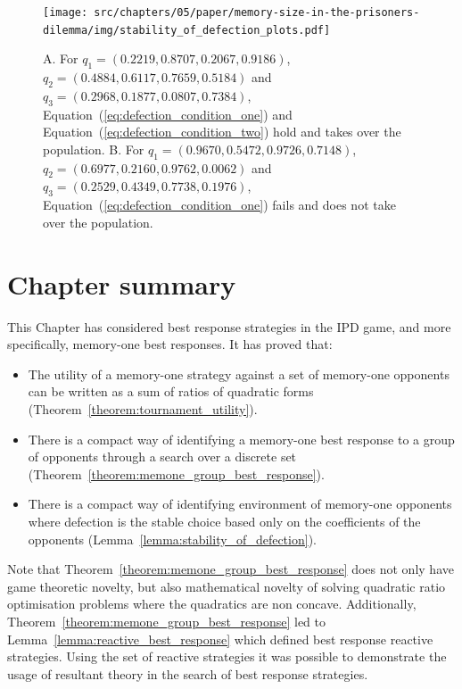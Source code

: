 \begin{figure}[!htbp]
    \centering
    \texttt{[image: src/chapters/05/paper/memory-size-in-the-prisoners-dilemma/img/stability\_of\_defection\_plots.pdf]}
    \caption{A. For \(q_{1}=(0.2219, 0.8707, 0.2067, 0.9186)\),
    $q_{2}=(0.4884, 0.6117, 0.7659, 0.5184)$ and
    $q_{3}=(0.2968, 0.1877, 0.0807, 0.7384)$, Equation~(\ref{eq:defection_condition_one}) and
    Equation~(\ref{eq:defection_condition_two}) hold and \Defector takes over the
    population. \protect\linebreak
    B. For $q_{1}=(0.9670, 0.5472, 0.9726, 0.7148)$,
    $q_{2}=(0.6977, 0.2160, 0.9762, 0.0062)$ and
    $q_{3}=(0.2529, 0.4349, 0.7738, 0.1976)$, Equation~(\ref{eq:defection_condition_one}) fails
    and \Defector does not take over the population.}\label{fig:stability_of_defection}
\end{figure}

\section{Chapter summary}

This Chapter has considered best response strategies in the IPD
game, and more specifically, memory-one best responses. It has proved that:

\begin{itemize}
    \item The utility of a memory-one strategy against a set
          of memory-one opponents can be written as a sum of ratios of quadratic
          forms (Theorem~\ref{theorem:tournament_utility}).
    \item There is a compact way of identifying a memory-one best response to a
        group of opponents through a search over a discrete set
        (Theorem~\ref{theorem:memone_group_best_response}).
    \item There is a compact way of identifying environment of memory-one
    opponents where defection is the stable choice based only on the
    coefficients of the opponents (Lemma~\ref{lemma:stability_of_defection}).
\end{itemize}

Note that Theorem~\ref{theorem:memone_group_best_response} does not only
have game theoretic novelty, but also mathematical novelty of solving quadratic
ratio optimisation problems where the quadratics are non concave. Additionally,
Theorem~\ref{theorem:memone_group_best_response} led to
Lemma~\ref{lemma:reactive_best_response} which defined best response reactive
strategies. Using the set of reactive strategies it was possible to demonstrate
the usage of resultant theory in the search of best response strategies.

